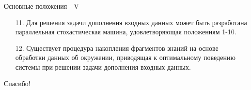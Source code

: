 \documentclass{beamer}
\begin{document}
\begin{frame}{Основные положения - V}
\begin{itemize}
	\item[11.] Для решения задачи дополнения входных данных может быть разработана параллельная стохастическая машина, удовлетворяющая положениям 1-10.
	\medskip
	\item[12.] Существует процедура накопления фрагментов знаний на основе обработки данных об окружении, приводящая к оптимальному поведению системы при решении задачи дополнения входных данных.
\end{itemize}
\end{frame}

\begin{frame}{}
    \thispagestyle{empty}
    \begin{center}
        {\large Спасибо!}
    \end{center}
\end{frame}
\end{document}
